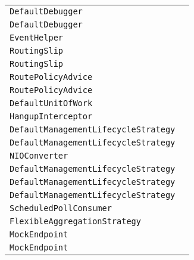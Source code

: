 \begin{center}
\begin{tabular}{ll}
\lstinline/DefaultDebugger/&\raisebox{0pt}{\lstinline/onAfterProcess(Exchange,Processor,ProcessorDefinition,long,Breakpoint)/}\\
\lstinline/DefaultDebugger/&\raisebox{0pt}{\lstinline/onEvent(Exchange,EventObject,Breakpoint)/}\\
\lstinline/EventHelper/&\raisebox{0pt}{\lstinline/doNotifyEvent(EventNotifier,EventObject)/}\\
\lstinline/RoutingSlip/&\raisebox{0pt}{\lstinline/done(boolean)/}\\
\lstinline/RoutingSlip/&\raisebox{0pt}{\lstinline/doInAsyncProducer(Producer,AsyncProcessor,Exchange,ExchangePattern,AsyncCallback)/}\\
\lstinline/RoutePolicyAdvice/&\raisebox{0pt}{\lstinline/Objectbefore(Exchange)/}\\
\lstinline/RoutePolicyAdvice/&\raisebox{0pt}{\lstinline/after(Exchange,Object)/}\\
\lstinline/DefaultUnitOfWork/&\raisebox{0pt}{\lstinline/DefaultUnitOfWork(Exchange,Logger)/}\\
\lstinline/HangupInterceptor/&\raisebox{0pt}{\lstinline/run()/}\\
\lstinline/DefaultManagementLifecycleStrategy/&\raisebox{0pt}{\lstinline/onThreadPoolRemove(CamelContext,ThreadPoolExecutor)/}\\
\lstinline/DefaultManagementLifecycleStrategy/&\raisebox{0pt}{\lstinline/onRoutesRemove(Collection)/}\\
\lstinline/NIOConverter/&\raisebox{0pt}{\lstinline/ByteBuffertoByteBuffer(String,Exchange)/}\\
\lstinline/DefaultManagementLifecycleStrategy/&\raisebox{0pt}{\lstinline/onComponentAdd(String,Component)/}\\
\lstinline/DefaultManagementLifecycleStrategy/&\raisebox{0pt}{\lstinline/onComponentRemove(String,Component)/}\\
\lstinline/DefaultManagementLifecycleStrategy/&\raisebox{0pt}{\lstinline/onEndpointRemove(Endpoint)/}\\
\lstinline/ScheduledPollConsumer/&\raisebox{0pt}{\lstinline/doRun()/}\\
\lstinline/FlexibleAggregationStrategy/&\raisebox{0pt}{\lstinline/safeInsertIntoCollection(Exchange,Collection,EtoInsert)/}\\
\lstinline/MockEndpoint/&\raisebox{0pt}{\lstinline/assertIsNotSatisfied(long)/}\\
\lstinline/MockEndpoint/&\raisebox{0pt}{\lstinline/assertIsNotSatisfied()/}\\

\end{tabular}
\end{center}
